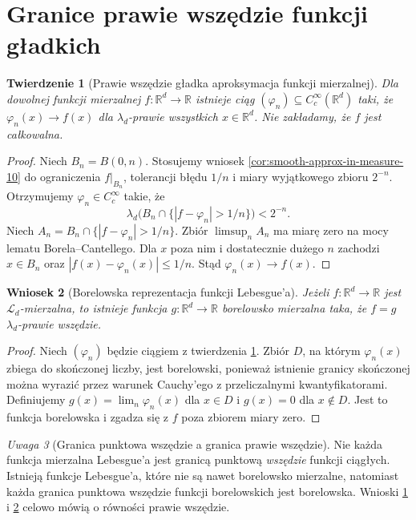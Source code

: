 \documentclass[11pt,a4paper,oneside]{book}
\numberwithin{equation}{chapter}
\theoremstyle{plain}
\newtheorem{twierdzenie}{Twierdzenie}[chapter]
\newtheorem{wniosek}[twierdzenie]{Wniosek}
\theoremstyle{definition}
\theoremstyle{remark}
\newtheorem{uwaga}[twierdzenie]{Uwaga}
\begin{document}
\section{Granice prawie wszędzie funkcji gładkich}

\begin{twierdzenie}[Prawie wszędzie gładka aproksymacja funkcji mierzalnej]
\label{thm:ae-smooth-approx-10}
Dla dowolnej funkcji mierzalnej
$f:\mathbb R^d\to\mathbb R$ istnieje ciąg
$(\varphi_n)\subseteq C_c^\infty(\mathbb R^d)$
taki, że $\varphi_n(x)\to f(x)$ dla
$\lambda_d$-prawie wszystkich $x\in\mathbb R^d$.
Nie zakładamy, że $f$ jest całkowalna.
\end{twierdzenie}
\begin{proof}
Niech $B_n=B(0,n)$. Stosujemy wniosek
\ref{cor:smooth-approx-in-measure-10} do ograniczenia
$f|_{B_n}$, tolerancji błędu $1/n$ i miary
wyjątkowego zbioru $2^{-n}$. Otrzymujemy
$\varphi_n\in C_c^\infty$ takie, że
\[
\lambda_d\bigl(B_n\cap
\{|f-\varphi_n|>1/n\}\bigr)<2^{-n}.
\]
Niech $A_n=B_n\cap\{|f-\varphi_n|>1/n\}$.
Zbiór $\limsup_n A_n$ ma miarę zero na mocy
lematu Borela--Cantellego. Dla $x$ poza nim
i dostatecznie dużego $n$ zachodzi $x\in B_n$
oraz $|f(x)-\varphi_n(x)|\le1/n$.
Stąd $\varphi_n(x)\to f(x)$.
\end{proof}

\begin{wniosek}[Borelowska reprezentacja funkcji Lebesgue'a]
\label{cor:borel-representative-10}
Jeżeli $f:\mathbb R^d\to\mathbb R$ jest
$\mathcal L_d$-mierzalna, to istnieje funkcja
$g:\mathbb R^d\to\mathbb R$ borelowsko mierzalna
taka, że $f=g$ $\lambda_d$-prawie wszędzie.
\end{wniosek}
\begin{proof}
Niech $(\varphi_n)$ będzie ciągiem z twierdzenia
\ref{thm:ae-smooth-approx-10}.
Zbiór $D$, na którym $\varphi_n(x)$ zbiega
do skończonej liczby, jest borelowski, ponieważ
istnienie granicy skończonej można wyrazić przez
warunek Cauchy'ego z przeliczalnymi kwantyfikatorami.
Definiujemy $g(x)=\lim_n\varphi_n(x)$ dla $x\in D$
i $g(x)=0$ dla $x\notin D$.
Jest to funkcja borelowska i zgadza się z $f$
poza zbiorem miary zero.
\end{proof}

\begin{uwaga}[Granica punktowa wszędzie a granica prawie wszędzie]
Nie każda funkcja mierzalna Lebesgue'a jest granicą
punktową \emph{wszędzie} funkcji ciągłych.
Istnieją funkcje Lebesgue'a, które nie są nawet
borelowsko mierzalne, natomiast każda granica
punktowa wszędzie funkcji borelowskich jest
borelowska. Wnioski
\ref{thm:ae-smooth-approx-10} i
\ref{cor:borel-representative-10} celowo mówią
o równości prawie wszędzie.
\end{uwaga}
\end{document}
